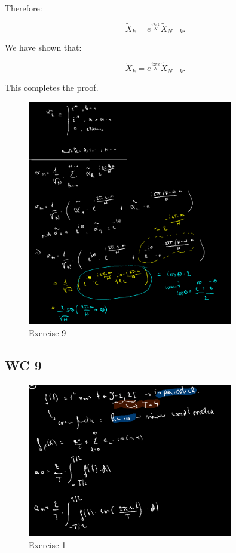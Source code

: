 \documentclass[a4paper]{report}
\begin{document}
Therefore:

\[
	\widetilde{X}_k = e^{\frac{i2\pi k}{N}} \widetilde{X}_{N - k}.
\]

We have shown that:

\[
	\widetilde{X}_k = e^{\frac{i2\pi k}{N}} \widetilde{X}_{N - k}.
\]

This completes the proof.

\begin{figure}[H]
	\centering
	\includegraphics[width=0.8\textwidth]{assets/huis_9_ex_9.png}
	\caption{Exercise 9}
	\label{fig:huis_9_ex_9}
\end{figure}

\subsection*{WC 9}

\begin{figure}[H]
	\centering
	\includegraphics[width=0.8\textwidth]{assets/wc_9_ex_1.png}
	\caption{Exercise 1}
	\label{fig:wc_9_ex_1}
\end{figure}
\end{document}
